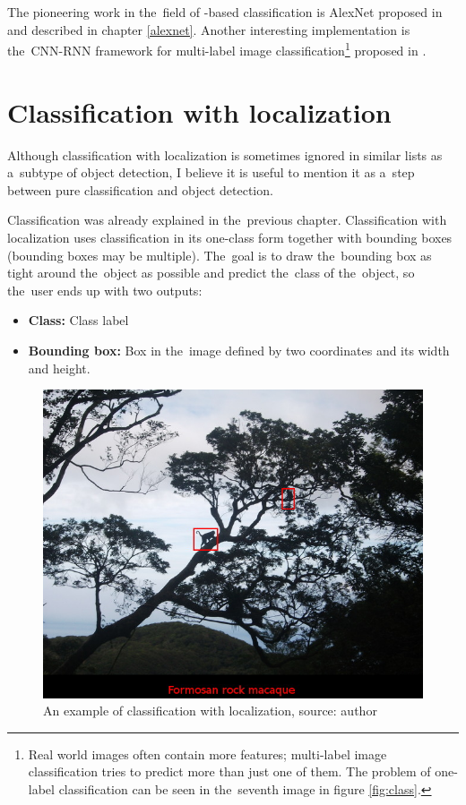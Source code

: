 The pioneering work in the~field of -based classification is AlexNet 
proposed in \cite{cnn-classification} and described in chapter \ref{alexnet}. 
Another interesting implementation is the~CNN-RNN framework for multi-label 
image classification\footnote{Real world images often contain more features; 
multi-label image classification tries to predict more than just one of them. 
The problem of one-label classification can be seen in the~seventh image in 
figure \ref{fig:class}.} proposed in \cite{multi-classification}.

\section{Classification with localization}
\label{classification-localization}

Although classification with localization is sometimes ignored in similar lists 
as a~subtype of object detection, I believe it is useful to mention it as a~step 
between pure classification and object detection.

Classification was already explained in the~previous chapter. Classification 
with localization uses classification in its one-class form together with 
bounding boxes (bounding boxes may be multiple). The~goal is to draw
the~bounding box as tight around the~object as possible and predict the~class of
the~object, so the~user ends up with two outputs:
\begin{itemize}
	\item \textbf{Class:} Class label
	\item \textbf{Bounding box:} Box in the~image defined by two coordinates and
	its width and height.
\end{itemize}

\begin{figure}[H]
   \centering
   \includegraphics[width=.7\linewidth]{./pictures/class-loc.JPG}
	\caption[Classification with localization example]{An example of classification 
	with localization, source: author}
      \label{fig:class-loc}
\end{figure}

